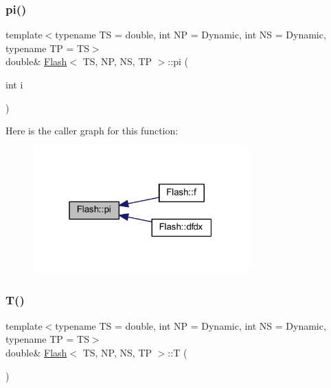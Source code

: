 \subsubsection{\texorpdfstring{pi()}{pi()}}
{\footnotesize\ttfamily template$<$typename TS = double, int NP = Dynamic, int NS = Dynamic, typename TP = TS$>$ \\
double\& \mbox{\hyperlink{class_flash}{Flash}}$<$ TS, NP, NS, TP $>$\+::pi (\begin{DoxyParamCaption}\item[{int}]{i }\end{DoxyParamCaption})\hspace{0.3cm}{\ttfamily [inline]}}

Here is the caller graph for this function\+:
\nopagebreak
\begin{figure}[H]
\begin{center}
\leavevmode
\includegraphics[width=235pt]{class_flash_ae54dbc3d5d7b87c854a765e9b5f4e519_icgraph}
\end{center}
\end{figure}
\mbox{\label{class_flash_af0f7e7c438368d98a6ea330d40b39cd3}} 
\subsubsection{\texorpdfstring{T()}{T()}}
{\footnotesize\ttfamily template$<$typename TS = double, int NP = Dynamic, int NS = Dynamic, typename TP = TS$>$ \\
double\& \mbox{\hyperlink{class_flash}{Flash}}$<$ TS, NP, NS, TP $>$\+::T (\begin{DoxyParamCaption}{ }\end{DoxyParamCaption})\hspace{0.3cm}{\ttfamily [inline]}}

